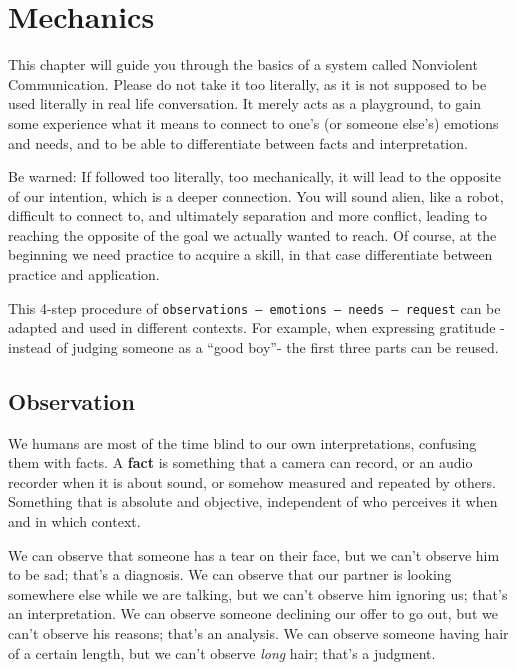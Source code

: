 \chapter{Mechanics}\label{ch:mechanics}

This chapter will guide you through the basics of a system called Nonviolent Communication.
Please do not take it too literally, as it is not supposed to be used literally in real life conversation.
It merely acts as a playground, to gain some experience what it means to connect to one's (or someone else's) emotions and needs, and to be able to differentiate between facts and interpretation.

Be warned: If followed too literally, too mechanically, it will lead to the opposite of our intention, which is a deeper connection.
You will sound alien, like a robot, difficult to connect to, and ultimately separation and more conflict, leading to reaching the opposite of the goal we actually wanted to reach.
Of course, at the beginning we need practice to acquire a skill, in that case differentiate between practice and application.

This 4-step procedure of \texttt{observations -- emotions -- needs -- request} can be adapted and used in different contexts.
For example, when expressing gratitude -instead of judging someone as a ``good boy''- the first three parts can be reused.

\section{Observation}\label{sec:observation}


We humans are most of the time blind to our own interpretations, confusing them with facts.
A \textbf{fact} is something that a camera can record, or an audio recorder when it is about sound, or somehow measured and repeated by others.
Something that is absolute and objective, independent of who perceives it when and in which context.

We can observe that someone has a tear on their face, but we can't observe him to be sad; that's a diagnosis.
We can observe that our partner is looking somewhere else while we are talking, but we can't observe him ignoring us; that's an interpretation.
We can observe someone declining our offer to go out, but we can't observe his reasons; that's an analysis.
We can observe someone having hair of a certain length, but we can't observe \textit{long} hair; that's a judgment.


